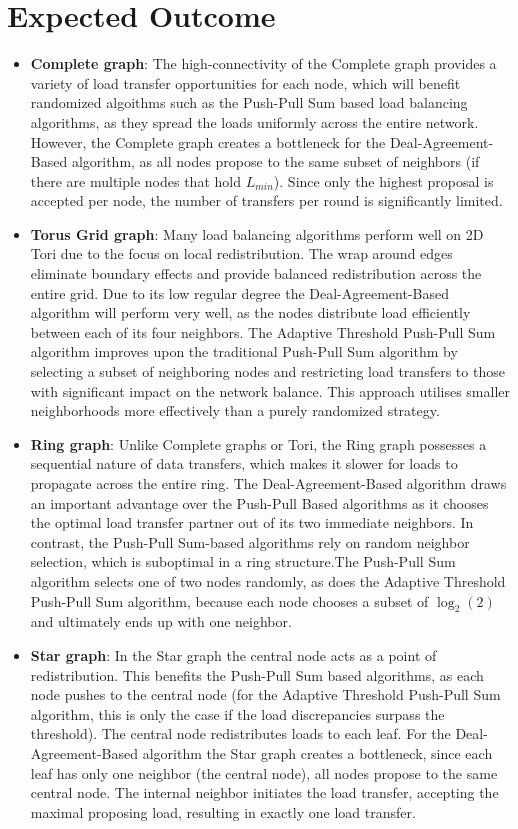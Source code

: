 \section{Expected Outcome}\label{sec:expectedoutcome}
\begin{itemize}
    \item \textbf{Complete graph}: The high-connectivity of the Complete graph provides a variety of load transfer opportunities for each node, which will benefit randomized algoithms such as the Push-Pull Sum based load balancing algorithms, as they spread the loads uniformly across the entire network. However, the Complete graph creates a bottleneck for the Deal-Agreement-Based algorithm, as all nodes propose to the same subset of neighbors (if there are multiple nodes that hold $L_{min}$). Since only the highest proposal is accepted per node, the number of transfers per round is significantly limited. 
    \item \textbf{Torus Grid graph}: Many load balancing algorithms perform well on 2D Tori due to the focus on local redistribution. The wrap around edges eliminate boundary effects and provide balanced redistribution across the entire grid. Due to its low regular degree the Deal-Agreement-Based algorithm will perform very well, as the nodes distribute load efficiently between each of its four neighbors. The Adaptive Threshold Push-Pull Sum algorithm improves upon the traditional Push-Pull Sum algorithm by selecting a subset of neighboring nodes and restricting load transfers to those with significant impact on the network balance. This approach utilises smaller neighborhoods more effectively than a purely randomized strategy.
    \item  \textbf{Ring graph}: Unlike Complete graphs or Tori, the Ring graph possesses a sequential nature of data transfers, which makes it slower for loads to propagate across the entire ring. The Deal-Agreement-Based algorithm draws an important advantage over the Push-Pull Based algorithms as it chooses the optimal load transfer partner out of its two immediate neighbors. In contrast, the Push-Pull Sum-based algorithms rely on random neighbor selection, which is suboptimal in a ring structure.The Push-Pull Sum algorithm selects one of two nodes randomly, as does the Adaptive Threshold Push-Pull Sum algorithm, because each node chooses a subset of $\log_{2}{(2)}$ and ultimately ends up with one neighbor.
    \item \textbf{Star graph}: In the Star graph the central node acts as a point of redistribution. This benefits the Push-Pull Sum based algorithms, as each node pushes to the central node (for the Adaptive Threshold Push-Pull Sum algorithm, this is only the case if the load discrepancies surpass the threshold). The central node redistributes loads to each leaf. For the Deal-Agreement-Based algorithm the Star graph creates a bottleneck, since each leaf has only one neighbor (the central node), all nodes propose to the same central node. The internal neighbor initiates the load transfer, accepting the maximal proposing load, resulting in exactly one load transfer.

\end{itemize}
